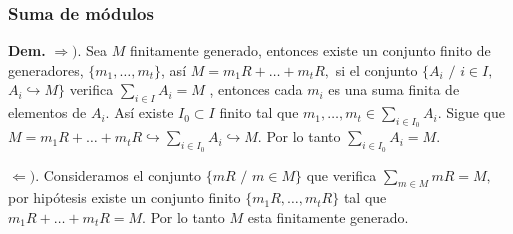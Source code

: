 \documentclass[notes=show]{beamer}%
\begin{document}
\begin{frame}%


\bigskip%
\frametitle{Suma de módulos}%


\bigskip\textbf{Dem. }$\Rightarrow).$ Sea $M$ finitamente generado, entonces
existe un conjunto finito de generadores, $\{m_{1},\ldots,m_{t}\}$, así
$M=m_{1}R+\ldots+m_{t}R,$ si el conjunto $\{A_{i}$ $/$ $i\in I,$
$A_{i}\hookrightarrow M\}$ verifica $%
{\displaystyle\sum\limits_{i\in I}}
A_{i}=M$ , entonces cada $m_{i}$ es una suma finita de elementos de $A_{i}.$
Así existe $I_{0}\subset I$ finito tal que $m_{1},\ldots,m_{t}\in%
{\displaystyle\sum\limits_{i\in I_{0}}}
A_{i}.$ Sigue que $M=m_{1}R+\ldots+m_{t}R\hookrightarrow%
{\displaystyle\sum\limits_{i\in I_{0}}}
A_{i}\hookrightarrow M$. Por lo tanto $%
{\displaystyle\sum\limits_{i\in I_{0}}}
A_{i}=M.$

$\Longleftarrow).$ Consideramos el conjunto $\{mR$ $/$ $m\in M\}$ que verifica
$%
{\displaystyle\sum\limits_{m\in M}}
mR=M,$ por hipótesis existe un conjunto finito $\{m_{1}R,\ldots,m_{t}R\}$
tal que $m_{1}R+\ldots+m_{t}R=M.$ Por lo tanto $M$ esta finitamente generado.

\bigskip

\bigskip%

\transboxout
\end{frame}%


\bigskip%
\end{document}
